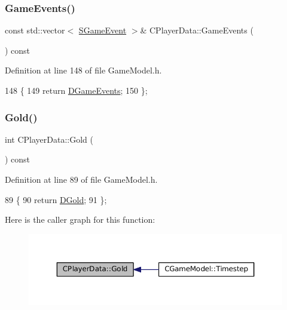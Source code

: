 \subsubsection{\texorpdfstring{Game\+Events()}{GameEvents()}}
{\footnotesize\ttfamily const std\+::vector$<$ \hyperlink{structSGameEvent}{S\+Game\+Event} $>$\& C\+Player\+Data\+::\+Game\+Events (\begin{DoxyParamCaption}{ }\end{DoxyParamCaption}) const\hspace{0.3cm}{\ttfamily [inline]}}



Definition at line 148 of file Game\+Model.\+h.


\begin{DoxyCode}
148                                                          \{
149             \textcolor{keywordflow}{return} \hyperlink{classCPlayerData_a9a7af43e88055d6d1a384a8817a655a0}{DGameEvents};
150         \};
\end{DoxyCode}
\hypertarget{classCPlayerData_afa5c728fc86335a9ca00b5121c0ec765}{}\label{classCPlayerData_afa5c728fc86335a9ca00b5121c0ec765} 
\subsubsection{\texorpdfstring{Gold()}{Gold()}}
{\footnotesize\ttfamily int C\+Player\+Data\+::\+Gold (\begin{DoxyParamCaption}{ }\end{DoxyParamCaption}) const\hspace{0.3cm}{\ttfamily [inline]}}



Definition at line 89 of file Game\+Model.\+h.


\begin{DoxyCode}
89                         \{
90             \textcolor{keywordflow}{return} \hyperlink{classCPlayerData_afa66ff31262c9b287ae8c13259aae6f3}{DGold};   
91         \};
\end{DoxyCode}
Here is the caller graph for this function\+:
\nopagebreak
\begin{figure}[H]
\begin{center}
\leavevmode
\includegraphics[width=350pt]{classCPlayerData_afa5c728fc86335a9ca00b5121c0ec765_icgraph}
\end{center}
\end{figure}
\hypertarget{classCPlayerData_abba8a81a8d4d8309e8cd68016ee1900b}{}\label{classCPlayerData_abba8a81a8d4d8309e8cd68016ee1900b} 
